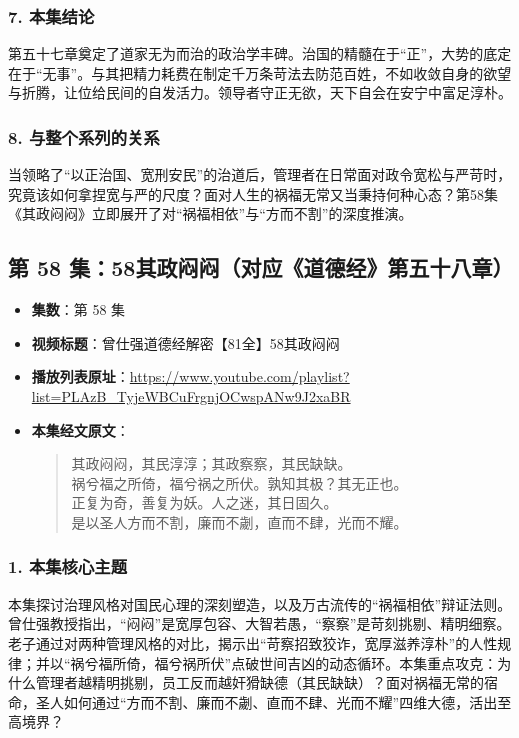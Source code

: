 \subsubsection{7. 本集结论}
第五十七章奠定了道家无为而治的政治学丰碑。治国的精髓在于“正”，大势的底定在于“无事”。与其把精力耗费在制定千万条苛法去防范百姓，不如收敛自身的欲望与折腾，让位给民间的自发活力。领导者守正无欲，天下自会在安宁中富足淳朴。

\subsubsection{8. 与整个系列的关系}
当领略了“以正治国、宽刑安民”的治道后，管理者在日常面对政令宽松与严苛时，究竟该如何拿捏宽与严的尺度？面对人生的祸福无常又当秉持何种心态？第58集《其政闷闷》立即展开了对“祸福相依”与“方而不割”的深度推演。

\clearpage

\subsection{第 58 集：58其政闷闷（对应《道德经》第五十八章）}
\label{sec:ep58}

\begin{itemize}
    \item \textbf{集数}：第 58 集
    \item \textbf{视频标题}：曾仕强道德经解密【81全】58其政闷闷
    \item \textbf{播放列表原址}：\url{https://www.youtube.com/playlist?list=PLAzB_TyjeWBCuFrgnjOCwspANw9J2xaBR}
    \item \textbf{本集经文原文}：
    \begin{quote}\kaishu
    其政闷闷，其民淳淳；其政察察，其民缺缺。\\
    祸兮福之所倚，福兮祸之所伏。孰知其极？其无正也。\\
    正复为奇，善复为妖。人之迷，其日固久。\\
    是以圣人方而不割，廉而不劌，直而不肆，光而不耀。
    \end{quote}
\end{itemize}

\subsubsection{1. 本集核心主题}
本集探讨治理风格对国民心理的深刻塑造，以及万古流传的“祸福相依”辩证法则。曾仕强教授指出，“闷闷”是宽厚包容、大智若愚，“察察”是苛刻挑剔、精明细察。老子通过对两种管理风格的对比，揭示出“苛察招致狡诈，宽厚滋养淳朴”的人性规律；并以“祸兮福所倚，福兮祸所伏”点破世间吉凶的动态循环。本集重点攻克：为什么管理者越精明挑剔，员工反而越奸猾缺德（其民缺缺）？面对祸福无常的宿命，圣人如何通过“方而不割、廉而不劌、直而不肆、光而不耀”四维大德，活出至高境界？


